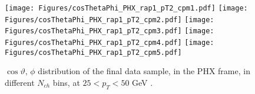 \documentclass[12pt]{article}
\newcommand{\pt}{$p_{\mathrm{T}}$}
\begin{document}
\begin{figure}[htbp]
\centering
\texttt{[image: Figures/cosThetaPhi\_PHX\_rap1\_pT2\_cpm1.pdf]}
\texttt{[image: Figures/cosThetaPhi\_PHX\_rap1\_pT2\_cpm2.pdf]}
\texttt{[image: Figures/cosThetaPhi\_PHX\_rap1\_pT2\_cpm3.pdf]}
\texttt{[image: Figures/cosThetaPhi\_PHX\_rap1\_pT2\_cpm4.pdf]}
\texttt{[image: Figures/cosThetaPhi\_PHX\_rap1\_pT2\_cpm5.pdf]}
\caption{$\cos\vartheta,\,\phi$ distribution of the final data sample, 
	in the PHX frame, in different $N_{ch}$ bins, at $25 < p_{T} < 50$ GeV .}
\end{figure}
\clearpage

\end{document}

